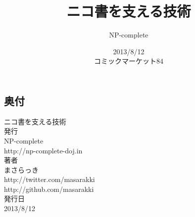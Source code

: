 \documentclass{jarticle}
\title{ニコ書を支える技術}
\author{NP-complete}
\date{2013/8/12\\コミックマーケット84}
\begin{document}
\Huge
\maketitle
\normalsize
\thispagestyle{empty}
\newpage
\thispagestyle{empty}
\-
\newpage


\newpage


\newpage


\newpage


\newpage


\newpage


\newpage


\newpage


\newpage


\newpage

\newpage

\begin{center}
  \Large
  \section*{奥付}
           {\huge ニコ書を支える技術}
           \\[2.0cm]
           発行\\
           NP-complete\\
           http://np-complete-doj.in
           \\[1.5cm]
           著者\\
           まさらっき\\
           http://twitter.com/masarakki\\
           http://github.com/masarakki
           \\[2.5cm]
           発行日\\
           2013/8/12
\end{center}
\newpage
\thispagestyle{empty}
\-
\newpage
\begin{flushright}
  \-
\end{flushright}

\thispagestyle{empty}
\end{document}
